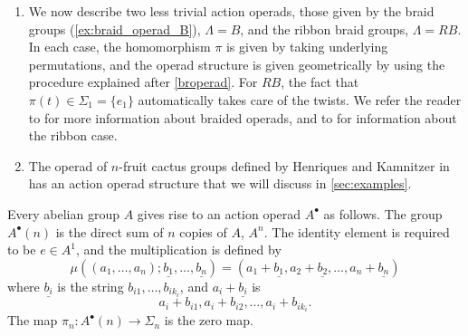 \begin{example}
\begin{enumerate}
\item We now describe two less trivial action operads, those given by the braid groups (\cref{ex:braid_operad_B}), $\Lambda = B$, and the ribbon braid groups, $\Lambda = RB$. In each case, the homomorphism $\pi$ is given by taking underlying permutations, and the operad structure is given geometrically by using the procedure explained after \cref{broperad}. For $RB$, the fact that $\pi(t) \in \Sigma_1 = \{e_1\}$ automatically takes care of the twists. We refer the reader to \cite{fie-br} for more information about braided operads, and to \cite{sal-wahl, wahl-thesis} for information about the ribbon case.
\item The operad of $n$-fruit cactus groups defined by Henriques and Kamnitzer in \cite{hk-cobound} has an action operad structure that we will discuss in \cref{sec:examples}.
\end{enumerate}
\end{example}

\begin{example}
Every abelian group $A$ gives rise to an action operad $A^{\bullet}$ as follows. The group $A^{\bullet}(n)$ is the direct sum of $n$ copies of $A$, $A^{n}$. The identity element is required to be $e \in A^{1}$, and the multiplication is defined by
  \[
    \mu((a_{1}, \ldots, a_{n}); \underline{b_1}, \ldots, \underline{b_n}) = (a_{1}+\underline{b_{1}}, a_{2} + \underline{b_{2}}, \ldots, a_{n} + \underline{b_{n}})
  \]
where $\underline{b_{i}}$ is the string $b_{i1}, \ldots, b_{ik_{i}}$, and $a_{i} + \underline{b_{i}}$ is
  \[
    a_{i} + b_{i1}, a_{i} + b_{i2}, \ldots, a_{i} + b_{ik_{i}}.
  \]
The map $\pi_n \colon A^\bullet(n) \rightarrow \Sigma_n$ is the zero map. 
\end{example}


